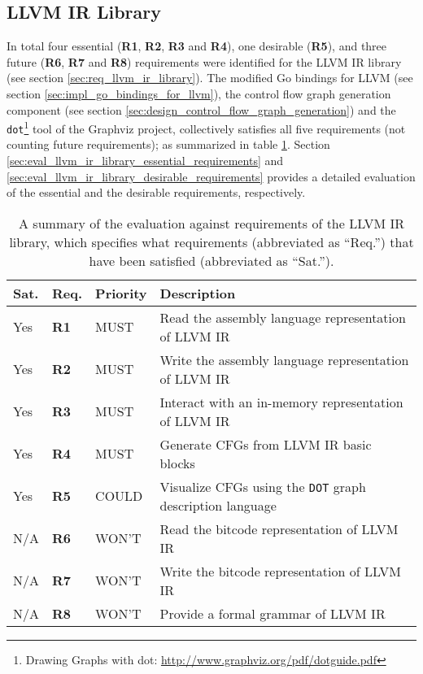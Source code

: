 
\subsection{LLVM IR Library}

In total four essential (\textbf{R1}, \textbf{R2}, \textbf{R3} and \textbf{R4}), one desirable (\textbf{R5}), and three future (\textbf{R6}, \textbf{R7} and \textbf{R8}) requirements were identified for the LLVM IR library (see section \ref{sec:req_llvm_ir_library}). The modified Go bindings for LLVM (see section \ref{sec:impl_go_bindings_for_llvm}), the control flow graph generation component (see section \ref{sec:design_control_flow_graph_generation}) and the \texttt{dot}\footnote{Drawing Graphs with dot: \url{http://www.graphviz.org/pdf/dotguide.pdf}} tool of the Graphviz project, collectively satisfies all five requirements (not counting future requirements); as summarized in table \ref{tbl:eval_summary_of_llvm_ir_library}. Section \ref{sec:eval_llvm_ir_library_essential_requirements} and \ref{sec:eval_llvm_ir_library_desirable_requirements} provides a detailed evaluation of the essential and the desirable requirements, respectively.

\begin{table}[htbp]
	\begin{center}
		\begin{tabular}{|l|l|l|l|}
			\hline
			Sat. & Req. & Priority & Description \\
			\hline
			\rowcolor{light_green_3}
			Yes & \textbf{R1} & MUST & Read the assembly language representation of LLVM IR \\
			\rowcolor{light_green_3}
			Yes & \textbf{R2} & MUST & Write the assembly language representation of LLVM IR \\
			\rowcolor{light_green_3}
			Yes & \textbf{R3} & MUST & Interact with an in-memory representation of LLVM IR \\
			\rowcolor{light_green_3}
			Yes & \textbf{R4} & MUST & Generate CFGs from LLVM IR basic blocks \\
			\hline
			\rowcolor{light_green_3}
			Yes & \textbf{R5} & COULD & Visualize CFGs using the \texttt{DOT} graph description language \\
			\hline
			N/A & \textbf{R6} & WON'T & Read the bitcode representation of LLVM IR \\
			N/A & \textbf{R7} & WON'T & Write the bitcode representation of LLVM IR \\
			N/A & \textbf{R8} & WON'T & Provide a formal grammar of LLVM IR \\
			\hline
		\end{tabular}
	\end{center}
	\caption{A summary of the evaluation against requirements of the LLVM IR library, which specifies what requirements (abbreviated as ``Req.'') that have been satisfied (abbreviated as ``Sat.'').}
	\label{tbl:eval_summary_of_llvm_ir_library}
\end{table}




